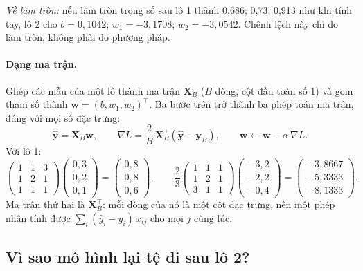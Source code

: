 \noindent\textit{Về làm tròn:} nếu làm tròn trọng số sau lô 1 thành 0,686; 0,73; 0,913 như khi tính tay, lô 2 cho $b = 0{,}1042$; $w_1 = -3{,}1708$; $w_2 = -3{,}0542$. Chênh lệch này chỉ do làm tròn, không phải do phương pháp.

\paragraph{Dạng ma trận.} Ghép các mẫu của một lô thành ma trận $\mathbf{X}_B$ ($B$ dòng, cột đầu toàn số 1) và gom tham số thành $\mathbf{w} = (b, w_1, w_2)^\top$. Ba bước trên trở thành ba phép toán ma trận, đúng với mọi số đặc trưng:
\begin{equation}
    \hat{\mathbf{y}} = \mathbf{X}_B\mathbf{w}, \qquad
    \nabla L = \frac{2}{B}\,\mathbf{X}_B^\top(\hat{\mathbf{y}} - \mathbf{y}_B), \qquad
    \mathbf{w} \leftarrow \mathbf{w} - \alpha\,\nabla L .
\end{equation}
Với lô 1:
\[
    \begin{pmatrix} 1 & 1 & 3 \\ 1 & 2 & 1 \\ 1 & 1 & 1 \end{pmatrix}
    \begin{pmatrix} 0{,}3 \\ 0{,}2 \\ 0{,}1 \end{pmatrix}
    = \begin{pmatrix} 0{,}8 \\ 0{,}8 \\ 0{,}6 \end{pmatrix}, \qquad
    \frac{2}{3}
    \begin{pmatrix} 1 & 1 & 1 \\ 1 & 2 & 1 \\ 3 & 1 & 1 \end{pmatrix}
    \begin{pmatrix} -3{,}2 \\ -2{,}2 \\ -0{,}4 \end{pmatrix}
    = \begin{pmatrix} -3{,}8667 \\ -5{,}3333 \\ -8{,}1333 \end{pmatrix}.
\]
Ma trận thứ hai là $\mathbf{X}_B^\top$: mỗi dòng của nó là một cột đặc trưng, nên một phép nhân tính được $\sum_i(\hat{y}_i - y_i)\,x_{ij}$ cho mọi $j$ cùng lúc.

\subsection{Vì sao mô hình lại tệ đi sau lô 2?}

